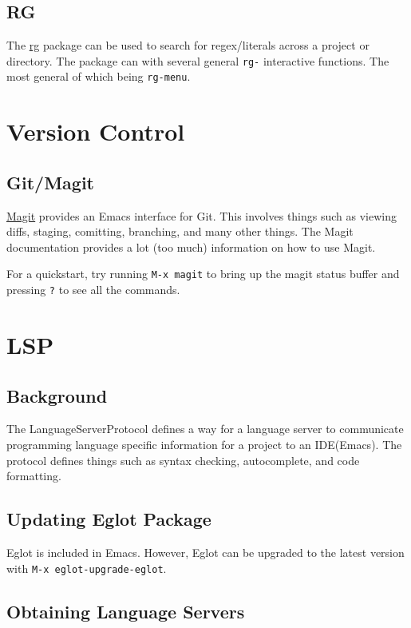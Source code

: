 \documentclass[11pt]{article}
\begin{document}
\subsection{RG}
\label{sec:org65262d5}

The \href{https://github.com/dajva/rg.el}{rg} package can be used to search for regex/literals across a project or
directory. The package can with several general \texttt{rg-} interactive functions. The
most general of which being \texttt{rg-menu}.
\section{Version Control}
\label{sec:org396d0bf}

\subsection{Git/Magit}
\label{sec:org3f0cd24}

\href{https://github.com/magit/magit/tree/e3806cbb7dd38ab73624ad48024998705f9d0d20}{Magit} provides an Emacs interface for Git. This involves things such as viewing
diffs, staging, comitting, branching, and many other things. The Magit
documentation provides a lot (too much) information on how to use Magit.

For a quickstart, try running \texttt{M-x magit} to bring up the magit status buffer
and pressing \texttt{?} to see all the commands.
\section{LSP}
\label{sec:orgca38180}

\subsection{Background}
\label{sec:org23f7bcb}
The LanguageServerProtocol defines a way for a language server to communicate
programming language specific information for a project to an IDE(Emacs). The
protocol defines things such as syntax checking, autocomplete, and code
formatting.
\subsection{Updating Eglot Package}
\label{sec:org68f18e2}

Eglot is included in Emacs. However, Eglot can be upgraded to the latest version
with \texttt{M-x eglot-upgrade-eglot}.
\subsection{Obtaining Language Servers}
\label{sec:org57abd11}
\end{document}
